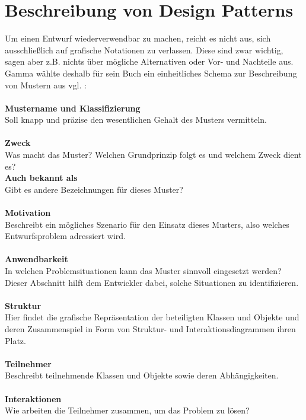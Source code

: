 \documentclass[fontsize=11pt,a4paper,final]{scrreprt}[2003/01/01]
\begin{document}
\section{Beschreibung von Design Patterns}\label{se:Beschreibung von Design Patterns}
Um einen Entwurf wiederverwendbar zu machen, reicht es nicht aus, sich ausschließlich auf grafische Notationen zu verlassen. Diese sind zwar wichtig, sagen aber z.B. nichts über mögliche Alternativen oder Vor- und Nachteile aus. Gamma wählte deshalb für sein Buch ein einheitliches Schema zur Beschreibung von Mustern aus vgl. \cite[S. 8-10]{gamma2004}: \\ \\
\textbf{Mustername und Klassifizierung} \\
Soll knapp und präzise den wesentlichen Gehalt des Musters vermitteln. \\ \\
\textbf{Zweck} \\
Was macht das Muster? Welchen Grundprinzip folgt es und welchem Zweck dient es? \\
\newpage \noindent 
\textbf{Auch bekannt als} \\
Gibt es andere Bezeichnungen für dieses Muster? \\ \\
\textbf{Motivation} \\
Beschreibt ein mögliches Szenario für den Einsatz dieses Musters, also welches Entwurfsproblem adressiert wird. \\ \\
\textbf{Anwendbarkeit} \\
In welchen Problemsituationen kann das Muster sinnvoll eingesetzt werden? Dieser Abschnitt hilft dem Entwickler dabei, solche Situationen zu identifizieren. \\ \\
\textbf{Struktur} \\
Hier findet die grafische Repräsentation der beteiligten Klassen und Objekte und deren Zusammenspiel in Form von Struktur- und Interaktionsdiagrammen ihren Platz. \\ \\
\textbf{Teilnehmer} \\
Beschreibt teilnehmende Klassen und Objekte sowie deren Abhängigkeiten. \\ \\
\textbf{Interaktionen} \\
Wie arbeiten die Teilnehmer zusammen, um das Problem zu lösen? \\ \\
\end{document}
